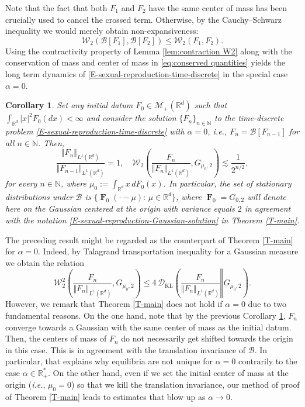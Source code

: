 \documentclass[reqno]{amsart}
\newtheorem{corollary}[definition]{Corollary}
\DeclareMathOperator{\bF}{\boldsymbol{F}}
\numberwithin{equation}{section}
\begin{document}
{Note that the fact that both $F_1$ and $F_2$ have the same center of mass has been crucially used to cancel the crossed term. Otherwise, by the Cauchy--Schwarz inequality we would merely obtain non-expansiveness:
\begin{equation}\label{eq:non expansivity W2}
\mathcal{W}_2(\mathcal{B}[F_1],\mathcal{B}[F_2])\leq \mathcal{W}_2(F_1,F_2).
\end{equation}
Using the contractivity property of Lemma \ref{lem:contraction W2} along with the conservation of mass and center of mass in \eqref{eq:conserved quantities} yields the long term dynamics of \eqref{E-sexual-reproduction-time-discrete} in the special case $\alpha=0$.

\begin{corollary}\label{cor:contraction W2}
Set any initial datum $F_0\in \mathcal{M}_+(\mathbb{R}^d)$ such that $\int_{\mathbb{R}^d}\vert x\vert^2 F_0(dx)<\infty$ and consider the solution $\{F_n\}_{n\in \mathbb{N}}$ to the time-discrete problem \eqref{E-sexual-reproduction-time-discrete} with $\alpha=0$, {\em i.e.}, $F_n=\mathcal{B}[F_{n-1}]$ for all $n\in \mathbb{N}$. Then,
$$
\frac{\Vert F_n\Vert_{L^1(\mathbb{R}^d)}}{\Vert F_{n-1}\Vert_{L^1(\mathbb{R}^d)}}=1,\quad \mathcal{W}_2\left(\frac{F_n}{\Vert F_n\Vert_{L^1(\mathbb{R}^d)}},G_{\mu_0,2}\right)\lesssim \frac{1}{2^{n/2}},
$$
for every $n\in \mathbb{N}$, where $\mu_0:=\int_{\mathbb{R}^d}x\,dF_0(x)$. In particular, the set of stationary distributions under $\mathcal{B}$ is $\{\bF_0(\cdot-\mu):\,\mu\in \mathbb{R}^d\}$, where $\bF_0=G_{0,2}$ will denote here on the Gaussian centered at the origin with variance equals $2$ in agreement with the notation \eqref{E-sexual-reproduction-Gaussian-solution} in Theorem \ref{T-main}.
\end{corollary}

The preceding result might be regarded as the counterpart of Theorem \ref{T-main} for $\alpha=0$. Indeed, by Talagrand transportation inequality for a Gaussian measure \cite{T-96} we obtain the relation 
$$\mathcal{W}_2^2\left(\frac{F_n}{\Vert F_n\Vert_{L^1(\mathbb{R}^d)}},G_{\mu_0,2}\right)\leq 4\,\mathcal{D}_{\text{KL}}\left(\left.\frac{F_n}{\Vert F_n\Vert_{L^1(\mathbb{R}^d)}}\right\Vert G_{\mu_0,2}\right).$$
However, we remark that Theorem \ref{T-main} does not hold if $\alpha=0$ due to two fundamental reasons. On the one hand, note that by the previous Corollary \ref{cor:contraction W2}, $F_n$ converge towards a Gaussian with the same center of mass as the initial datum. Then, the centers of mass of $F_n$ do not necessarily get shifted towards the origin in this case. This is in agreement with the translation invariance of $\mathcal{B}$. In particular, that explains why equilibria are not unique for $\alpha=0$ contrarily to the case $\alpha\in \mathbb{R}_+^*$. On the other hand, even if we set the initial center of mass at the origin ({\em i.e.}, $\mu_0=0$) so that we kill the translation invariance, our method of proof of Theorem \ref{T-main} leads to estimates that blow up as $\alpha\rightarrow 0$.

}
\end{document}
